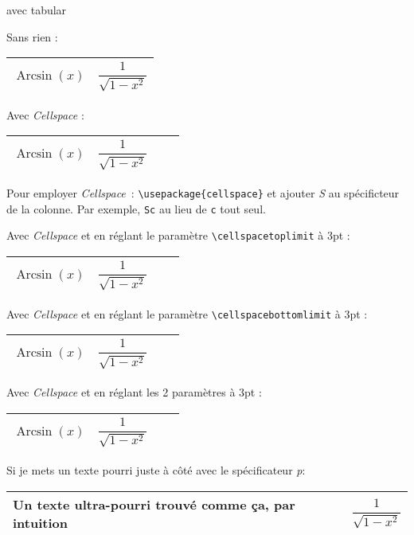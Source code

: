 \documentclass{article}
\DeclareMathOperator{\Arcsin}{Arcsin}
\begin{document}
\begin{center}
	\Large avec tabular
\end{center}

Sans rien :
\begin{tabular}{|c|c|}
	\hline
	$\Arcsin{}(x)$& $\dfrac{1}{\sqrt{1-x^2}}$\\
	\hline
\end{tabular}
\qquad
Avec \textsl{Cellspace} :
\begin{tabular}{|Sc|Sc|}
	\hline
	$\Arcsin{}(x)$& $\dfrac{1}{\sqrt{1-x^2}}$\\
	\hline
\end{tabular}

Pour employer \textsl{Cellspace}~: \verb|\usepackage{cellspace}| et
ajouter \textsl{S} au spécificteur de la colonne. Par exemple, \verb|Sc|
au lieu de \verb|c| tout seul.

Avec \textsl{Cellspace} et en réglant le paramètre
\verb|\cellspacetoplimit| à 3pt :
\begin{center}
	\setlength{\cellspacetoplimit}{3pt}
	\begin{tabular}{|Sc|Sc|}
		\hline
		$\Arcsin{}(x)$& $\dfrac{1}{\sqrt{1-x^2}}$\\
		\hline
	\end{tabular}
\end{center}


Avec \textsl{Cellspace} et en réglant le paramètre
\verb|\cellspacebottomlimit| à 3pt :
\begin{center}
	\setlength{\cellspacebottomlimit}{3pt}
	\begin{tabular}{|Sc|Sc|}
		\hline
		$\Arcsin{}(x)$& $\dfrac{1}{\sqrt{1-x^2}}$\\
		\hline
	\end{tabular}
\end{center}

Avec \textsl{Cellspace} et en réglant les 2 paramètres à 3pt :
\begin{center}
	\setlength{\cellspacebottomlimit}{3pt}
	\setlength{\cellspacetoplimit}{3pt}
	\begin{tabular}{|Sc|Sc|}
		\hline
		$\Arcsin{}(x)$& $\dfrac{1}{\sqrt{1-x^2}}$\\
		\hline
	\end{tabular}
\end{center}


Si je mets un texte pourri juste à côté avec le spécificateur \textsl{p}:
\begin{center}
	\begin{tabular}{|p{1cm}|c|}
		\hline
		Un texte ultra-pourri trouvé comme ça, par intuition
		& $\dfrac{1}{\sqrt{1-x^2}}$\\
		\hline
	\end{tabular}
\end{center}
\end{document}
